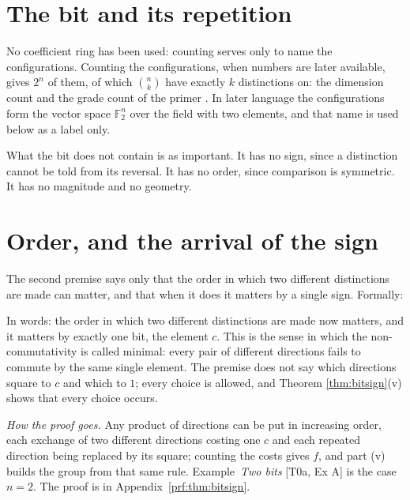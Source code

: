 \documentclass[11pt]{article}
\theoremstyle{definition}
\theoremstyle{plain}
\providecommand{\F}{}\renewcommand{\F}{\mathbb{F}}
\begin{document}
\section{The bit and its repetition}

\label{c:note.geometry-first.setting-bit-repetition}
No coefficient ring has been used: counting serves only to name the configurations. Counting the configurations, when numbers are later available, gives $2^{n}$ of them, of which $\binom{n}{k}$ have exactly $k$ distinctions on: the dimension count and the grade count of the primer \cite[Section 3]{ButlerT0}. In later language the configurations form the vector space $\F_{2}^{n}$ over the field with two elements, and that name is used below as a label only.

What the bit does not contain is as important. It has no sign, since a distinction cannot be told from its reversal. It has no order, since comparison is symmetric. It has no magnitude and no geometry.

\section{Order, and the arrival of the sign}

\label{c:note.geometry-first.setting-order-arrival-sign}
The second premise says only that the order in which two different distinctions are made can matter, and that when it does it matters by a single sign. Formally:

\label{c:note.geometry-first.setting-order-arrival-sign-2}
In words: the order in which two different distinctions are made now matters, and it matters by exactly one bit, the element $c$. This is the sense in which the non-commutativity is called minimal: every pair of different directions fails to commute by the same single element. The premise does not say which directions square to $c$ and which to $1$; every choice is allowed, and Theorem \ref{thm:bitsign}(v) shows that every choice occurs.

\label{c:note.geometry-first.setting-order-arrival-sign-3}
\noindent\emph{How the proof goes.} Any product of directions can be put in increasing order, each exchange of two different directions costing one $c$ and each repeated direction being replaced by its square; counting the costs gives $f$, and part (v) builds the group from that same rule. Example~\emph{Two bits} [T0a, Ex A] is the case $n = 2$. The proof is in Appendix~\ref{prf:thm:bitsign}.
\end{document}

